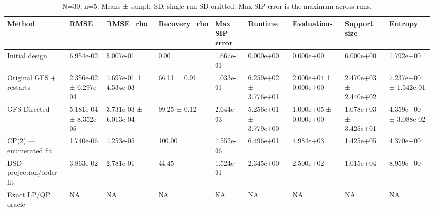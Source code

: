 \begin{table}
\caption{N=30, n=5. Means ± sample SD; single-run SD omitted. Max SIP error is the maximum across runs.}
\begin{tabular}{lllllllll}
\toprule
Method & RMSE & RMSE\_rho & Recovery\_rho & Max SIP error & Runtime & Evaluations & Support size & Entropy \\
\midrule
Initial design & 6.954e-02 & 5.007e-01 & 0.00 & 1.667e-01 & 0.000e+00 & 0.000e+00 & 6.000e+00 & 1.792e+00 \\
Original GFS + restarts & 2.356e-02 ± 6.297e-04 & 1.697e-01 ± 4.534e-03 & 66.11 ± 0.91 & 1.033e-01 & 6.259e+02 ± 3.776e+01 & 2.000e+04 ± 0.000e+00 & 2.470e+03 ± 2.440e+02 & 7.237e+00 ± 1.542e-01 \\
GFS-Directed & 5.181e-04 ± 8.352e-05 & 3.731e-03 ± 6.013e-04 & 99.25 ± 0.12 & 2.644e-03 & 5.256e+01 ± 3.779e+00 & 1.000e+05 ± 0.000e+00 & 1.078e+03 ± 3.425e+01 & 4.359e+00 ± 3.088e-02 \\
CP(2) — enumerated fit & 1.740e-06 & 1.253e-05 & 100.00 & 7.552e-06 & 6.496e+01 & 4.984e+03 & 1.425e+05 & 4.370e+00 \\
DSD — projection/order fit & 3.863e-02 & 2.781e-01 & 44.45 & 1.524e-01 & 2.345e+00 & 2.500e+02 & 1.015e+04 & 8.959e+00 \\
Exact LP/QP oracle & NA & NA & NA & NA & NA & NA & NA & NA \\
\bottomrule
\end{tabular}
\end{table}
